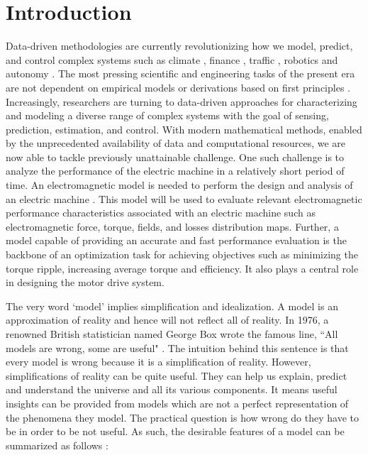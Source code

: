 \section{Introduction}

Data-driven methodologies are currently revolutionizing how we model, predict, and control complex systems such as climate \parencite{knusel2020understanding}, finance \parencite{hilpisch2018python}, traffic \parencite{lin2018efficient}, robotics and autonomy \parencite{zhang2018review}. The most pressing scientific and engineering tasks of the present era are not dependent on empirical models or derivations based on first principles \parencite{brunton2019data}. Increasingly, researchers are turning to data-driven approaches for characterizing and modeling a diverse range of complex systems with the goal of sensing, prediction, estimation, and control. With modern mathematical methods, enabled by the unprecedented availability of data and computational resources, we are now able to tackle previously unattainable challenge. One such challenge is to analyze the performance of the electric machine in a relatively short period of time. An electromagnetic model is needed to perform the design and analysis of an electric machine \parencite{mousavi2015design}. This model will be used to evaluate relevant electromagnetic performance characteristics associated with an electric machine such as electromagnetic force, torque, fields, and losses distribution maps. Further, a model capable of providing an accurate and fast performance evaluation is the backbone of an optimization task for achieving objectives such as minimizing the torque ripple, increasing average torque and efficiency. It also plays a central role in designing the motor drive system. 

The very word `model' implies simplification and idealization. A model is an approximation of reality and hence will not reflect all of reality. 
In 1976, a renowned British statistician named George Box wrote the famous line, ``All models are wrong, some are useful" \parencite{box1979all, george_stat_eng}. The intuition behind this sentence is that every model is wrong because it is a simplification of reality. However, simplifications of reality can be quite useful. They can help us explain, predict and understand the universe and all its various components. It means useful insights can be provided from models which are not a perfect representation of the phenomena they model. The practical question is how wrong do they have to be in order to be not useful. As such, the desirable features of a model can be summarized as follows \parencite{silva2018}:

